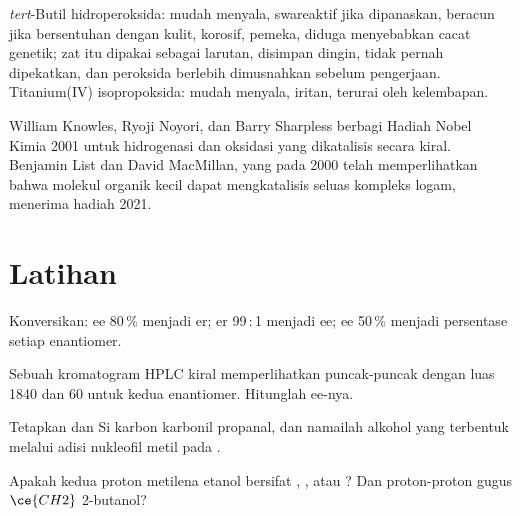 \begin{safety}{}
\textit{tert}-Butil hidroperoksida: mudah menyala, swareaktif jika dipanaskan, beracun jika bersentuhan dengan
kulit, korosif, pemeka, diduga menyebabkan cacat genetik; zat itu dipakai
sebagai larutan, disimpan dingin, tidak pernah dipekatkan, dan peroksida berlebih dimusnahkan
sebelum pengerjaan. Titanium(IV) isopropoksida: mudah menyala, iritan, terurai oleh
kelembapan.
\end{safety}

\begin{history}
William Knowles, Ryoji Noyori, dan Barry Sharpless berbagi Hadiah Nobel Kimia
2001 untuk hidrogenasi dan oksidasi yang dikatalisis secara kiral. Benjamin List
dan David MacMillan, yang pada 2000 telah memperlihatkan bahwa molekul organik kecil dapat
mengkatalisis  seluas kompleks logam, menerima
hadiah 2021.
\end{history}

\section{Latihan}

\begin{exercise}[$\star$]\label{exo:b3:asymmetric-synthesis:1}
Konversikan: ee 80\,\% menjadi er; er 99\,:\,1 menjadi ee; ee 50\,\% menjadi persentase setiap
enantiomer.
\end{exercise}

\begin{exercise}[$\star$]\label{exo:b3:asymmetric-synthesis:2}
Sebuah kromatogram HPLC kiral memperlihatkan puncak-puncak dengan luas 1840 dan 60 untuk kedua enantiomer.
Hitunglah ee-nya.
\end{exercise}

\begin{exercise}[$\star$]\label{exo:b3:asymmetric-synthesis:3}
Tetapkan  dan Si karbon karbonil propanal, dan namailah alkohol yang
terbentuk melalui adisi nukleofil metil pada .
\end{exercise}

\begin{exercise}[$\star$]\label{exo:b3:asymmetric-synthesis:4}
Apakah kedua proton metilena etanol bersifat , , atau ?
Dan proton-proton gugus $\ce{CH2}$ 2-butanol?
\end{exercise}

